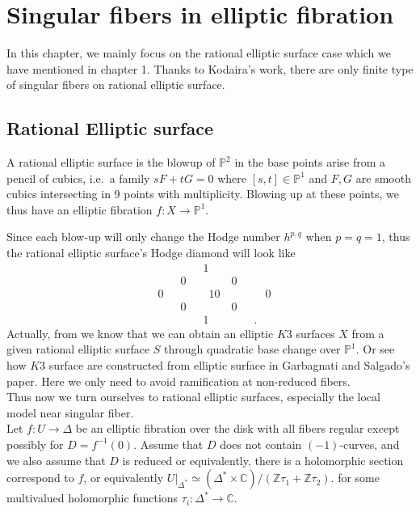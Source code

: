 
\chapter{Singular fibers in elliptic fibration}
In this chapter, we mainly focus on the rational elliptic surface case which we have mentioned in chapter 1. Thanks to Kodaira's work\cite{kodaira1963compact}, there are only finite type of singular fibers on rational elliptic surface.
\section{Rational Elliptic surface}
\begin{defi}
A rational elliptic surface is the blowup of $\mathbb{P}^2$ in the base points arise from  a pencil of cubics, i.e.\ a family $sF+tG=0$ where $[s,t]\in\mathbb{P}^1$ and $F,G$ are smooth cubics intersecting in 9 points with multiplicity. Blowing up at these points, we thus have an elliptic fibration $f\colon X\rightarrow\mathbb{P}^1$.
\end{defi}
Since each blow-up will only change the Hodge number $h^{p,q}$ when $p=q=1$\cite{rao2019dolbeault}, thus the rational elliptic surface's Hodge diamond will look like
\begin{displaymath}
\begin{split}
&\qquad  \qquad 1\\
&\qquad 0 \qquad \qquad 0\\
&0 \qquad \qquad \!\!\! 10 \qquad \qquad \!\! 0\\
& \qquad 0 \qquad \qquad 0\\
& \qquad \qquad 1 \qquad \qquad .
\end{split}
\end{displaymath}
\indent Actually, from \cite{schutt2019elliptic} we know that we can obtain an elliptic $K3$ surfaces $X$ from a given rational elliptic surface $S$ through quadratic base change over $\mathbb{P}^1$. Or see how $K3$ surface are constructed from elliptic surface in Garbagnati and Salgado's paper\cite{garbagnati2019linear}. Here we only need to avoid ramification at non-reduced fibers.\\ \indent
Thus now we turn ourselves to rational elliptic surfaces, especially the local model near singular fiber.\\ \indent
Let $f\colon U\rightarrow \Delta$ be an elliptic fibration over the disk with all fibers regular except possibly for $D=f^{-1}(0)$. Assume that $D$ does not contain $(-1)$-curves, and we also assume that $D$ is reduced or equivalently, there is a holomorphic section correspond to $f$, or equivalently $U|_{\Delta^*}\simeq(\Delta^*\times\mathbb{C})/(\mathbb{Z}\tau_1+\mathbb{Z}\tau_2).$ for some multivalued holomorphic functions $\tau_i\colon\Delta^*\rightarrow\mathbb{C}$.\\ \indent
